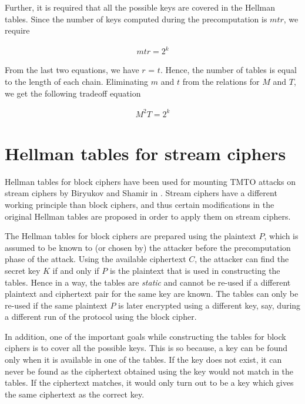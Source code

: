 Further, it is required that all the possible keys are covered in the Hellman tables. Since the number of keys computed during the precomputation is $mtr$, we require

\begin{align*}
mtr = 2^k
\end{align*}

From the last two equations, we have $r$ = $t$. Hence, the number of tables is equal to the length of each chain. Eliminating $m$ and $t$ from the relations for $M$ and $T$, we get the following tradeoff equation

\begin{align*}
M^{2}T = 2^k
\end{align*}


\section{Hellman tables for stream ciphers}

Hellman tables for block ciphers have been used for mounting TMTO attacks on stream ciphers by Biryukov and Shamir in \cite{biryukov2000ctm}. Stream ciphers have a different working principle than block ciphers, and thus certain modifications in the original Hellman tables are proposed in order to apply them on stream ciphers. 

The Hellman tables for block ciphers are prepared using the plaintext $P$, which is assumed to be known to (or chosen by) the attacker before the precomputation phase of the attack. Using the available ciphertext $C$, the attacker can find the secret key $K$ if and only if $P$ is the plaintext that is used in constructing the tables. Hence in a way, the tables are \emph{static} and cannot be re-used if a different plaintext and ciphertext pair for the same key are known. The tables can only be re-used if the same plaintext $P$ is later encrypted using a different key, say, during a different run of the protocol using the block cipher.

In addition, one of the important goals while constructing the tables for block ciphers is to cover all the possible keys. This is so because, a key can be found only when it is available in one of the tables. If the key does not exist, it can never be found as the ciphertext obtained using the key would not match in the tables. If the ciphertext matches, it would only turn out to be a key which gives the same ciphertext as the correct key. 

